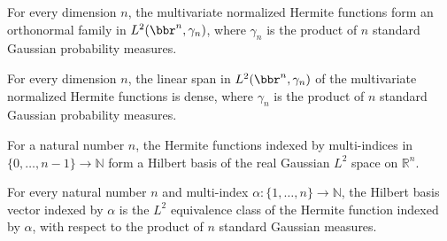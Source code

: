 \begin{theorem}
\label{BooleanAnalysis.GaussianSpace.hermiteL2_orthonormal}
\leanok
{}
For every dimension $n$, the multivariate normalized Hermite functions form an
orthonormal family in $L^2(\bbr^n,\gamma_n)$, where $\gamma_n$ is the product of $n$
standard Gaussian probability measures.
\end{theorem}

\begin{theorem}
\label{BooleanAnalysis.GaussianSpace.hermiteL2_dense}
\leanok
{}
For every dimension $n$, the linear span in $L^2(\bbr^n,\gamma_n)$ of the multivariate
normalized Hermite functions is dense, where $\gamma_n$ is the product of $n$ standard
Gaussian probability measures.
\end{theorem}

\begin{definition}
\label{BooleanAnalysis.GaussianSpace.hermiteHilbertBasis}
\leanok
{}
For a natural number $n$, the Hermite functions indexed by multi-indices in
$\{0,\ldots,n-1\}\to\mathbb N$ form a Hilbert basis of the real Gaussian $L^2$ space on
$\mathbb R^n$.
\end{definition}

\begin{lemma}
\label{BooleanAnalysis.GaussianSpace.hermiteHilbertBasis_apply}
\leanok
{}
For every natural number $n$ and multi-index $\alpha:\{1,\ldots,n\}\to\mathbb N$, the
Hilbert basis vector indexed by $\alpha$ is the $L^2$ equivalence class of the Hermite
function indexed by $\alpha$, with respect to the product of $n$ standard Gaussian
measures.
\end{lemma}

